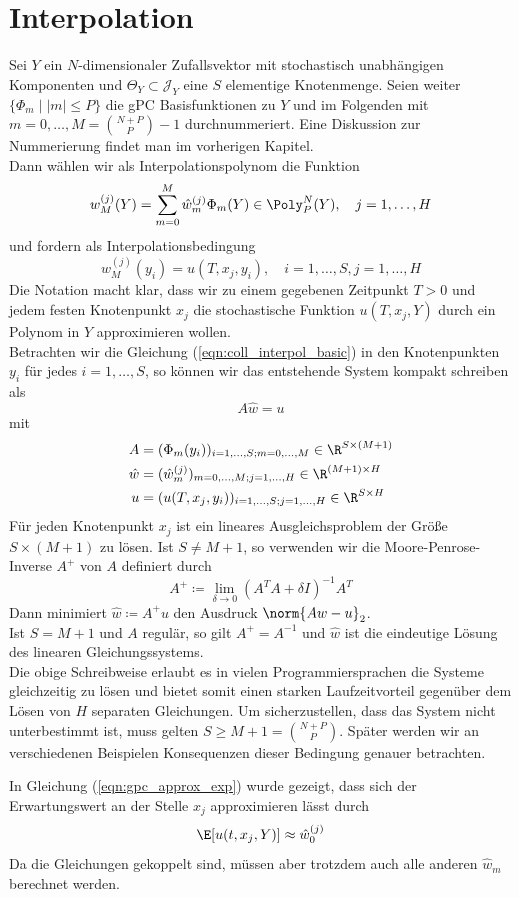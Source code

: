 \section{Interpolation}
Sei $Y$ ein $N$-dimensionaler Zufallsvektor mit stochastisch unabhängigen Komponenten und $\Theta_Y\subset \mathcal{J}_Y$ eine $S$ elementige Knotenmenge. Seien weiter $\lbrace \Phi_m \mid |m|\le P \rbrace$ die gPC Basisfunktionen zu $Y$ und im Folgenden mit $m=0,\dots,M=\binom{N+P}{P}-1$ durchnummeriert. Eine Diskussion zur Nummerierung findet man im vorherigen Kapitel.\\
Dann wählen wir als Interpolationspolynom die Funktion
\begin{equation}
\label{eqn:coll_interpol_basic}
w_M^{(j)}(Y)=\sum_{m=0}^M\hat{w}_m^{(j)}\Phi_m(Y)\in\Poly_P^N(Y),\quad j=1,\dots,H
\end{equation}
und fordern als Interpolationsbedingung
\[w_M^{(j)}(y_i)=u(T,x_j,y_i),\quad i=1,\dots,S, j=1,\dots,H\]
Die Notation macht klar, dass wir zu einem gegebenen Zeitpunkt $T>0$ und jedem festen Knotenpunkt $x_j$ die stochastische Funktion $u(T,x_j,Y)$ durch ein Polynom in $Y$ approximieren wollen.\\
Betrachten wir die Gleichung (\ref{eqn:coll_interpol_basic}) in den Knotenpunkten $y_i$ für jedes $i=1,\dots,S$, so können wir das entstehende System kompakt schreiben als
\begin{equation}
\label{eqn:interpol_compact}
A\hat{w}=u
\end{equation}
mit 
\begin{align*}
A&=(\Phi_m(y_i))_{i=1,\dots,S;m=0,\dots,M}\in\R^{S\times (M+1)}\\
\hat{w}&=(\hat{w}_m^{(j)})_{m=0,\dots,M;j=1,\dots,H}\in\R^{(M+1)\times H}\\
u&=(u(T,x_j,y_i))_{i=1,\dots,S;j=1,\dots,H}\in\R^{S\times H}\\
\end{align*}
Für jeden Knotenpunkt $x_j$ ist ein lineares Ausgleichsproblem der Größe $S\times (M+1)$ zu lösen. Ist $S\neq M+1$, so verwenden wir die Moore-Penrose-Inverse $A^+$ von $A$ definiert durch
\[A^+\coloneqq \lim\limits_{\delta\to 0}(A^TA+\delta I)^{-1}A^T\]
Dann minimiert $\hat{w}\coloneqq A^+u$ den Ausdruck $\norm{Aw-u}_2$.\\
Ist $S=M+1$ und $A$ regulär, so gilt $A^+=A^{-1}$ und $\hat{w}$ ist die eindeutige Lösung des linearen Gleichungssystems.\\[0.2cm] 
Die obige Schreibweise erlaubt es in vielen Programmiersprachen die Systeme gleichzeitig zu lösen und bietet somit einen starken Laufzeitvorteil gegenüber dem Lösen von $H$ separaten Gleichungen. Um sicherzustellen, dass das System nicht unterbestimmt ist, muss gelten $S\ge M+1=\binom{N+P}{P}$. Später werden wir an verschiedenen Beispielen Konsequenzen dieser Bedingung genauer betrachten.
\begin{mathbem}
In Gleichung (\ref{eqn:gpc_approx_exp}) wurde gezeigt, dass sich der Erwartungswert an der Stelle $x_j$ approximieren lässt durch
\[\E[u(t,x_j,Y)]\approx \hat{w}_0^{(j)}\]
Da die Gleichungen gekoppelt sind, müssen aber trotzdem auch alle anderen $\hat{w}_m$ berechnet werden.
\end{mathbem}
